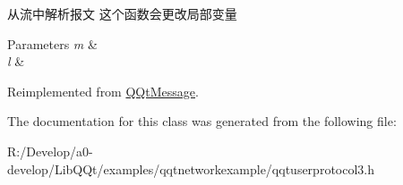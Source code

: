 从流中解析报文 这个函数会更改局部变量 


\begin{DoxyParams}{Parameters}
{\em m} & \\
\hline
{\em l} & \\
\hline
\end{DoxyParams}


Reimplemented from \mbox{\hyperlink{class_q_qt_message_a0bc25669bdd61490b1d8df6d77565f31}{Q\+Qt\+Message}}.



The documentation for this class was generated from the following file\+:\begin{DoxyCompactItemize}
\item 
R\+:/\+Develop/a0-\/develop/\+Lib\+Q\+Qt/examples/qqtnetworkexample/qqtuserprotocol3.\+h\end{DoxyCompactItemize}
